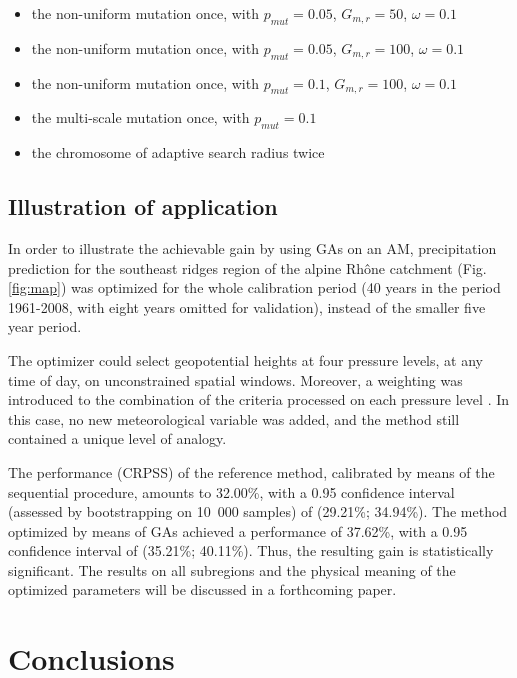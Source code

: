 \documentclass{ametsoc}
\begin{document}
\begin{itemize}
	\setlength\itemsep{-4px}
	\item the non-uniform mutation once, with $p_{mut}=0.05$, $G_{m,r}=50$, $\omega=0.1$
	\item the non-uniform mutation once, with $p_{mut}=0.05$, $G_{m,r}=100$, $\omega=0.1$
	\item the non-uniform mutation once, with $p_{mut}=0.1$, $G_{m,r}=100$, $\omega=0.1$
	\item the multi-scale mutation once, with  $p_{mut}=0.1$
	\item the chromosome of adaptive search radius twice
\end{itemize}


\subsection{Illustration of application}

In order to illustrate the achievable gain by using GAs on an AM, precipitation prediction for the southeast ridges region of the alpine Rh\^{o}ne catchment (Fig. \ref{fig:map}) was optimized for the whole calibration period (40 years in the period 1961-2008, with eight years omitted for validation), instead of the smaller five year period.

The optimizer could select geopotential heights at four pressure levels, at any time of day, on unconstrained spatial windows. Moreover, a weighting was introduced to the combination of the criteria processed on each pressure level \citep[such as in][]{Horton2012a, Junk2015}. In this case, no new meteorological variable was added, and the method still contained a unique level of analogy.

The performance (CRPSS) of the reference method, calibrated by means of the sequential procedure, amounts to 32.00\%, with a 0.95 confidence interval (assessed by bootstrapping on 10~000 samples) of (29.21\%; 34.94\%). The method optimized by means of GAs achieved a performance of 37.62\%, with a 0.95 confidence interval of (35.21\%; 40.11\%). Thus, the resulting gain is statistically significant. The results on all subregions and the physical meaning of the optimized parameters will be discussed in a forthcoming paper.


\section{Conclusions}
\label{sec:conclusions}
\end{document}
